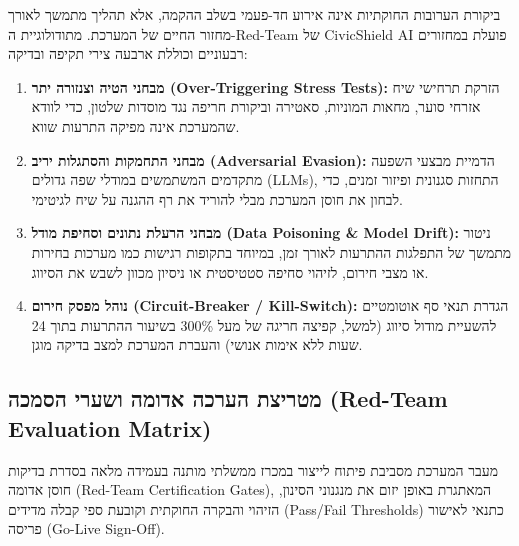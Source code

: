 ביקורת הערובות החוקתיות אינה אירוע חד-פעמי בשלב ההקמה, אלא תהליך מתמשך לאורך מחזור החיים של המערכת. מתודולוגיית ה-\textenglish{Red-Team} של \textenglish{CivicShield AI} פועלת במחזורים רבעוניים וכוללת ארבעה צירי תקיפה ובדיקה:
\begin{enumerate}
    \item \textbf{מבחני הטיה וצנזורה יתר (\textenglish{Over-Triggering Stress Tests}):} הזרקת תרחישי שיח אזרחי סוער, מחאות המוניות, סאטירה וביקורת חריפה נגד מוסדות שלטון, כדי לוודא שהמערכת אינה מפיקה התרעות שווא.
    \item \textbf{מבחני התחמקות והסתגלות יריב (\textenglish{Adversarial Evasion}):} הדמיית מבצעי השפעה מתקדמים המשתמשים במודלי שפה גדולים (\textenglish{LLMs}), התחזות סגנונית ופיזור זמנים, כדי לבחון את חוסן המערכת מבלי להוריד את רף ההגנה על שיח לגיטימי.
    \item \textbf{מבחני הרעלת נתונים וסחיפת מודל (\textenglish{Data Poisoning \& Model Drift}):} ניטור מתמשך של התפלגות ההתרעות לאורך זמן, במיוחד בתקופות רגישות כמו מערכות בחירות או מצבי חירום, לזיהוי סחיפה סטטיסטית או ניסיון מכוון לשבש את הסיווג.
    \item \textbf{נוהל מפסק חירום (\textenglish{Circuit-Breaker / Kill-Switch}):} הגדרת תנאי סף אוטומטיים להשעיית מודול סיווג (למשל, קפיצה חריגה של מעל \textenglish{300\%} בשיעור ההתרעות בתוך \textenglish{24} שעות ללא אימות אנושי) והעברת המערכת למצב בדיקה מוגן.
\end{enumerate}

\subsection{מטריצת הערכה אדומה ושערי הסמכה (\textenglish{Red-Team Evaluation Matrix})}
\label{sec:redteam_matrix}

מעבר המערכת מסביבת פיתוח לייצור במכרז ממשלתי מותנה בעמידה מלאה בסדרת בדיקות חוסן אדומה (\textenglish{Red-Team Certification Gates}), המאתגרת באופן יזום את מנגנוני הסינון, הזיהוי והבקרה החוקתית וקובעת ספי קבלה מדידים (\textenglish{Pass/Fail Thresholds}) כתנאי לאישור פריסה (\textenglish{Go-Live Sign-Off}).


